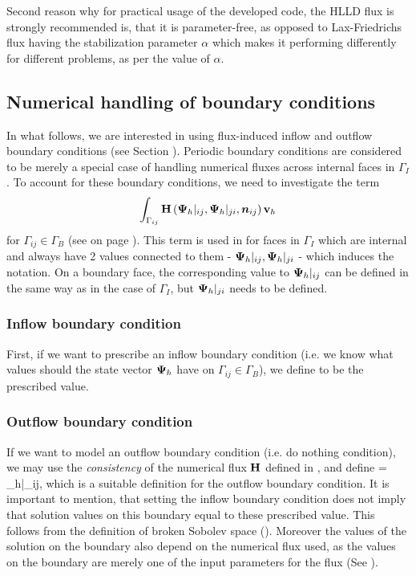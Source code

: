 Second reason why for practical usage of the developed code, the HLLD flux is strongly recommended is, that it is parameter-free, as opposed to Lax-Friedrichs flux having the stabilization parameter $\alpha$ which makes it performing differently for different problems, as per the value of $\alpha$.

\subsection{Numerical handling of boundary conditions}
In what follows, we are interested in using flux-induced inflow and outflow boundary conditions (see Section ). Periodic boundary conditions are considered to be merely a special case of handling numerical fluxes across internal faces in $\Gamma_I$ .
To account for these boundary conditions, we need to investigate the term
$$
\int_{\Gamma_{ij}} \mathrm{\mathbf{H}}\left({\mathrm{\mathbf{\Psi}}_h}|_{ij}, {\mathrm{\mathbf{\Psi}}_h}|_{ji}, \mbox{\boldmath $n$}_{ij}\right) \mathrm{\mathbf{v}}_h
$$
for $\Gamma_{ij} \in \Gamma_B$ (see  on page \pageref{BndEdges}).
This term is used in  for faces in $\Gamma_I$ which are internal and always have 2 values connected to them - $\mathrm{\mathbf{\Psi}}_h|_{ij}, {\mathrm{\mathbf{\Psi}}_h}|_{ji}$ - which induces the notation. On a boundary face, the corresponding value to ${\mathrm{\mathbf{\Psi}}_h}|_{ij}$ can be defined in the same way as in the case of $\Gamma_I$, but ${\mathrm{\mathbf{\Psi}}_h}|_{ji}$ needs to be defined.
\subsubsection{Inflow boundary condition}
First, if we want to prescribe an inflow boundary condition (i.e. we know what values should the state vector $\mathrm{\mathbf{\Psi}}_h$ have on ${\Gamma_{ij}}\in\Gamma_B$), we define
\be
\label{BC1} 
\ee
to be the prescribed value.

\subsubsection{Outflow boundary condition}
If we want to model an outflow boundary condition (i.e. do nothing condition), we may use the \textit{consistency} of the numerical flux $\mathrm{\mathbf{H}}$ defined in , and define
\be
\label{BC2}  = {\mrPsi_h}|_{ij},
\ee
which is a suitable definition for the outflow boundary condition. It is important to mention, that setting the inflow boundary condition does not imply that solution values on this boundary equal to these prescribed value. This follows from the definition of broken Sobolev space (). Moreover the values of the solution on the boundary also depend on the numerical flux used, as the values on the boundary are merely one of the input parameters for the flux (See ).

